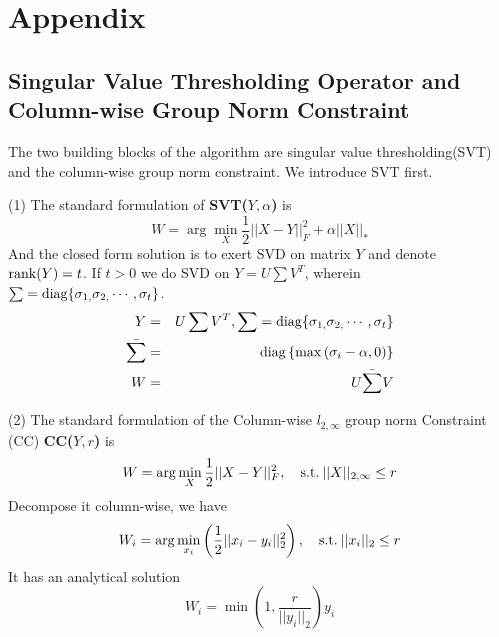 \documentclass[twoside,leqno,twocolumn]{article}
\begin{document}
\section*{Appendix}
\subsection*{Singular Value Thresholding Operator and Column-wise Group Norm Constraint}


The two building blocks of the algorithm are singular value thresholding(SVT)
and the column-wise group norm constraint. We introduce SVT first.

\noindent (1) The standard formulation of \textbf{SVT($Y,\alpha$)} is
\vskip -0.3cm
%
\begin{equation}
W = \arg \mathop {\min }\limits_X \frac{1}{2}||X - Y||_F^2 + \alpha ||X|{|_*}
\label{eq:svt}
\end{equation}
\vskip -0.3cm
%
And the closed form solution is to exert SVD on matrix $Y$ and denote
${\rm{rank}}(Y)=t$. If $t>0$ we do SVD on $Y=U\sum V^{T}$, wherein
$\sum  =  {\rm{diag\{ }}{\sigma _{1,}}{\sigma _{2,}} \cdots ,{\sigma _t}\}  $. 
\begin{eqnarray}
Y & = & U\sum V^{T},\sum  =  {\rm{diag\{ }}{\sigma _{1,}}{\sigma _{2,}} \cdots ,{\sigma _t}\}\\
\bar{\sum} & = & {\rm{diag}}\left\{ {\max \left( {{\sigma _i} - \alpha ,0} \right)} \right\} \nonumber \\
W & = & U\bar{\sum}V\nonumber 
\label{eq:U2-1}
\end{eqnarray}
%

\noindent (2) The standard formulation of the Column-wise $l_{2,\infty}$ group
norm Constraint (CC) \textbf{CC($Y,r$)} is
%
\begin{equation}
W = \arg \mathop {\min }\limits_X \frac{1}{2}||X - Y||_F^2,\quad{\rm{s.t.}}\:||X|{|_{2,\infty }} \le r
\label{eq:cc}
\end{equation}
%
Decompose it column-wise, we have
\begin{equation}
{W_{i}}={\rm {arg}}\mathop{\rm {min}}\limits _{{x_{i}}}\left({\frac{1}{2}||{x_{i}}-{y_{i}}||_{2}^{2}}\right),\quad{{\rm s.t.}}\:||{x_i}|{|_{2}}\leq r
\end{equation}
%
\noindent It has an analytical solution
\begin{equation}
{W_i} = \min \left( {1,\frac{r}{{||{y_i}|{|_2}}}} \right){y_i}
\label{eq:V3-1-2-1}
\end{equation}
\end{document}
